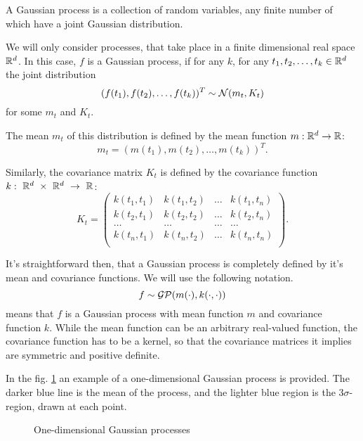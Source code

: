 A Gaussian process is a collection of random variables, any finite number of which have a joint Gaussian distribution.

We will only consider processes, that take place in a finite dimensional real space $\mathbb{R}^d$. In this case, $f$ is a Gaussian process, if for any $k$, for any $t_1, t_2, \ldots, t_k \in \mathbb{R}^d$ the joint distribution
$$(f(t_1), f(t_2), \ldots, f(t_k))^T \sim \mathcal{N}(m_t, K_t)$$
for some $m_t$ and $K_t$.

The mean $m_t$ of this distribution is defined by the mean function $m: \mathbb{R}^d \rightarrow \mathbb{R}$:
$$m_t = (m(t_1), m(t_2), \ldots, m(t_k))^T.$$

Similarly, the covariance matrix $K_t$ is defined by the covariance function $k:~\mathbb{R}^d~\times~\mathbb{R}^d~\rightarrow~\mathbb{R}$:
$$K_t = 
\left (\begin{array}{cccc} 
k(t_1, t_1) & k(t_1, t_2) & \ldots & k(t_1, t_n) \\
k(t_2, t_1) & k(t_2, t_2) & \ldots & k(t_2, t_n) \\
\ldots & \ldots & \ldots & \ldots \\
k(t_n, t_1) & k(t_n, t_2) & \ldots & k(t_n, t_n) \\
\end{array} \right).
$$

It's straightforward then, that a Gaussian process is completely defined by it's mean and covariance functions. We will use the following notation. 
$$f \sim \mathcal{GP}(m(\cdot), k(\cdot, \cdot))$$
means that $f$ is a Gaussian process with mean function $m$ and covariance function $k$. While the mean function can be an arbitrary real-valued function, the covariance function has to be a kernel, so that the covariance matrices it implies are symmetric and positive definite.

In the fig. \ref{reg_example} an example of a one-dimensional Gaussian process is provided. The darker blue line is the mean of the process, and the lighter blue region is the $3\sigma$-region, drawn at each point.


\begin{figure}[!h]
	\centering
		
	\caption{One-dimensional Gaussian processes}
	\label{reg_example}
\end{figure}